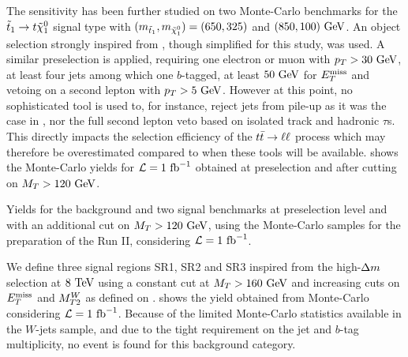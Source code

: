         The sensitivity has been further studied on two Monte-Carlo benchmarks for the
        $\tilde{t}_1 \rightarrow t \tilde{\chi}_1^0$ signal type with $(m_{\tilde{t}_1},
        m_{\tilde{\chi}_1^0}) = (650,325)$ and $(850,100)~\text{GeV}$. An object selection
        strongly inspired from , though simplified
        for this study, was used. A similar preselection is applied, requiring one electron
        or muon with $p_T > 30~\text{GeV}$, at least four jets among which one $b$-tagged, at least
        $50~\text{GeV}$ for $E_T^\text{miss}$ and vetoing on a second lepton with $p_T > 5~\text{GeV}$. However
        at this point, no sophisticated tool is used to, for instance, reject jets from
        pile-up as it was the case in , nor the full second
        lepton veto based on isolated track and hadronic $\tau$s. This directly impacts
        the selection efficiency of the $t\bar{t} \rightarrow \ell \ell$ process which may therefore be
        overestimated compared to when these tools will be available.
         shows the Monte-Carlo yields for $\mathcal{L} = 1~\text{fb}^{-1}$
        obtained at preselection and after cutting on $M_T > 120~\text{GeV}$.

        \begin{table}
            \centering
            
            \caption{Yields for the background and two signal benchmarks at
            preselection level and with an additional cut on $M_T > 120~\text{GeV}$,
            using the Monte-Carlo samples for the preparation of the Run II, considering
            $\mathcal{L} = 1~\text{fb}^{-1}$. \label{tab:phys14Preselection}}
        \end{table}

        We define three signal regions SR1, SR2 and SR3 inspired from the high-$\Delta m$
        selection at $8~\text{TeV}$ using a constant cut at $M_T > 160~\text{GeV}$ and increasing
        cuts on $E_T^\text{miss}$ and $M_{T2}^W$ as defined on .
         shows the yield obtained from Monte-Carlo considering
        $\mathcal{L} = 1~\text{fb}^{-1}$. Because of the limited Monte-Carlo statistics available
        in the $W$-jets sample, and due to the tight requirement on the jet and $b$-tag
        multiplicity, no event is found for this background category.

